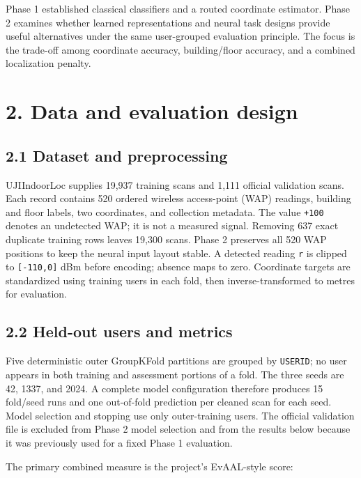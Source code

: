 \documentclass[
  10pt,
  a4paper,
]{article}
\begin{document}
Phase 1 established classical classifiers and a routed coordinate
estimator. Phase 2 examines whether learned representations and neural
task designs provide useful alternatives under the same user-grouped
evaluation principle. The focus is the trade-off among coordinate
accuracy, building/floor accuracy, and a combined localization penalty.

\section{2. Data and evaluation
design}\label{data-and-evaluation-design}

\subsection{2.1 Dataset and
preprocessing}\label{dataset-and-preprocessing}

UJIIndoorLoc supplies 19,937 training scans and 1,111 official
validation scans. Each record contains 520 ordered wireless access-point
(WAP) readings, building and floor labels, two coordinates, and
collection metadata. The value \texttt{+100} denotes an undetected WAP;
it is not a measured signal. Removing 637 exact duplicate training rows
leaves 19,300 scans. Phase 2 preserves all 520 WAP positions to keep the
neural input layout stable. A detected reading \texttt{r} is clipped to
\texttt{{[}-110,0{]}} dBm before encoding; absence maps to zero.
Coordinate targets are standardized using training users in each fold,
then inverse-transformed to metres for evaluation.

\subsection{2.2 Held-out users and
metrics}\label{held-out-users-and-metrics}

Five deterministic outer GroupKFold partitions are grouped by
\texttt{USERID}; no user appears in both training and assessment
portions of a fold. The three seeds are 42, 1337, and 2024. A complete
model configuration therefore produces 15 fold/seed runs and one
out-of-fold prediction per cleaned scan for each seed. Model selection
and stopping use only outer-training users. The official validation file
is excluded from Phase 2 model selection and from the results below
because it was previously used for a fixed Phase 1 evaluation.

The primary combined measure is the project's EvAAL-style score:
\end{document}
